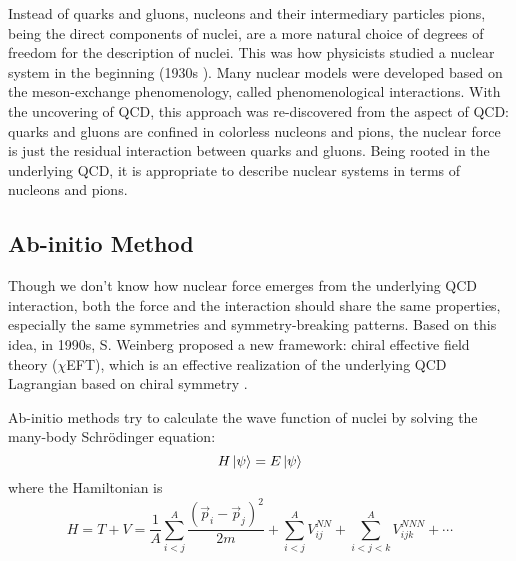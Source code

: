 Instead of quarks and gluons, nucleons and their intermediary particles pions,
being the direct components of nuclei, are a more natural choice of degrees of freedom for
the description of nuclei.
This was how physicists studied a nuclear system in the beginning (1930s \cite{10.1143/PTPS.1.1}). 
Many nuclear models were developed based on the meson-exchange phenomenology, called	%
phenomenological interactions. %
With the uncovering of QCD, this approach was re-discovered from the aspect of QCD:
quarks and gluons are confined in colorless nucleons and pions, the nuclear force
is just the residual interaction between quarks and gluons. Being rooted in the underlying
QCD, it is appropriate to describe nuclear systems in terms of nucleons and pions.

\subsection{Ab-initio Method}
Though we don't know how nuclear force emerges from the underlying QCD interaction,
both the force and the interaction should share the same properties, 
especially the same symmetries and symmetry-breaking patterns. 
Based on this idea, in 1990s, S. Weinberg proposed a new framework: chiral 
effective field theory ($\chi$EFT), which is an effective realization of the 
underlying QCD Lagrangian based on chiral symmetry \cite{WEINBERG1979327}.


Ab-initio methods try to calculate the wave function of nuclei by solving the
many-body Schr\"{o}dinger equation:
\begin{equation}
    H\ket{\psi} = E\ket{\psi}
\end{equation}
where the Hamiltonian is
\begin{equation}
    H = T + V = \frac{1}{A} \sum_{i<j}^A \frac{(\vec{p}_i - \vec{p}_j)^2}{2m} 
	+ \sum_{i<j}^A V_{ij}^{NN} + \sum_{i<j<k}^A V_{ijk}^{NNN} + \cdots
\end{equation}

